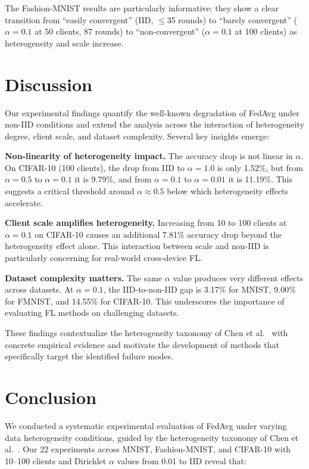 \documentclass[journal]{IEEEtran}
\begin{document}
The Fashion-MNIST results are particularly informative: they show a clear transition from ``easily convergent'' (IID, $\leq$35 rounds) to ``barely convergent'' ($\alpha=0.1$ at 50 clients, 87 rounds) to ``non-convergent'' ($\alpha=0.1$ at 100 clients) as heterogeneity and scale increase.


\section{Discussion}
\label{sec:discussion}

Our experimental findings quantify the well-known degradation of FedAvg under non-IID conditions and extend the analysis across the interaction of heterogeneity degree, client scale, and dataset complexity. Several key insights emerge:

\textbf{Non-linearity of heterogeneity impact.} The accuracy drop is not linear in $\alpha$. On CIFAR-10 (100 clients), the drop from IID to $\alpha=1.0$ is only 1.52\%, but from $\alpha=0.5$ to $\alpha=0.1$ it is 9.79\%, and from $\alpha=0.1$ to $\alpha=0.01$ it is 11.19\%. This suggests a critical threshold around $\alpha \approx 0.5$ below which heterogeneity effects accelerate.

\textbf{Client scale amplifies heterogeneity.} Increasing from 10 to 100 clients at $\alpha=0.1$ on CIFAR-10 causes an additional 7.81\% accuracy drop beyond the heterogeneity effect alone. This interaction between scale and non-IID is particularly concerning for real-world cross-device FL.

\textbf{Dataset complexity matters.} The same $\alpha$ value produces very different effects across datasets. At $\alpha=0.1$, the IID-to-non-IID gap is 3.17\% for MNIST, 9.00\% for FMNIST, and 14.55\% for CIFAR-10. This underscores the importance of evaluating FL methods on challenging datasets.

These findings contextualize the heterogeneity taxonomy of Chen et al.~\cite{chen2025advances} with concrete empirical evidence and motivate the development of methods that specifically target the identified failure modes.


\section{Conclusion}
\label{sec:conclusion}

We conducted a systematic experimental evaluation of FedAvg under varying data heterogeneity conditions, guided by the heterogeneity taxonomy of Chen et al.~\cite{chen2025advances}. Our 22 experiments across MNIST, Fashion-MNIST, and CIFAR-10 with 10--100 clients and Dirichlet $\alpha$ values from 0.01 to IID reveal that:
\end{document}
